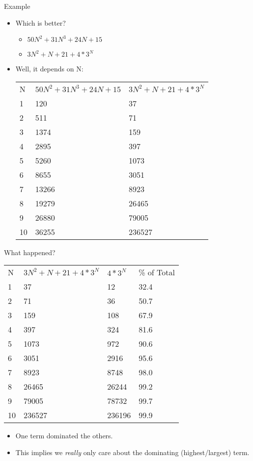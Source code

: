 \documentclass{beamer}
\begin{document}
\begin{frame}{Example}
\begin{itemize}
\item Which is better?
\begin{itemize}
\item $50N^2 + 31N^3 + 24N + 15$
\item $3N^2 + N + 21 + 4*3^N$
\end{itemize}
\item <2-> Well, it depends on N: \\
\begin{tabular}{l l l}
N  & $50N^2 + 31N^3 + 24N + 15$ & $3N^2 + N + 21 + 4*3^N$ \\
1   &       120     &           37 \\
2   &       511     &           71 \\
3   &      1374     &          159 \\
4   &      2895     &          397 \\
5   &      5260     &         1073 \\
6   &      8655     &         3051 \\
7   &     13266     &         8923 \\
8   &     19279     &        26465 \\
9   &     26880     &        79005 \\
10  &     36255     &       236527 \\
\end{tabular}
\end{itemize}
\end{frame}

\begin{frame}{What happened?}

\begin{tabular}{l l l l}
N  & $3N^2 + N + 21 + 4*3^N$  & $4*3^N$ & \% of Total \\
1  &         37  &        12  &      32.4 \\
2  &         71  &        36  &      50.7 \\
3  &        159  &       108  &      67.9 \\
4  &        397  &       324  &      81.6 \\
5  &       1073  &       972  &      90.6 \\
6  &       3051  &      2916  &      95.6 \\
7  &       8923  &      8748  &      98.0 \\
8  &      26465  &     26244  &      99.2 \\
9  &      79005  &     78732  &      99.7 \\
10 &     236527  &    236196  &      99.9 \\
\end{tabular}

\begin{itemize}
\item One term dominated the others.
\item This implies we \textit{really} only care about the dominating (highest/largest) term.
\end{itemize}
\end{frame}
\end{document}
